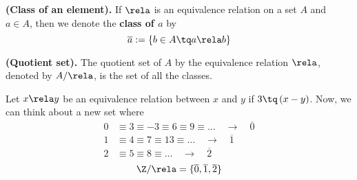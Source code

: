 \begin{definition}
    \textbf{(Class of an element).} If $\rela$ is an equivalence relation on a set $A$ and $a\in A$, then we denote the \textbf{class of $a$} by
    \begin{equation}
        \overline{a} := \{b\in A \tq a\rela b\} 
    \end{equation}
\end{definition}
\newpage
\begin{definition}
    \textbf{(Quotient set).} The quotient set of $A$ by the equivalence relation $\rela$, denoted by $A / \rela$, is the set of all the classes.
\end{definition}
\begin{example}
    Let $x\rela y$ be an equivalence relation between $x$ and $y$ if $3\tq \left( x - y \right)$. Now, we can think about a new set where
    \begin{align}
        0&\equiv 3\equiv -3\equiv 6\equiv 9\equiv\ldots\quad\rightarrow\quad\overline{0} \\
        1&\equiv 4\equiv 7\equiv 13\equiv\ldots\quad\rightarrow\quad\overline{1} \\
        2&\equiv 5\equiv 8\equiv\ldots\quad\rightarrow\quad\overline{2}
    \end{align}
    \begin{equation}
        \Z / \rela = \{\overline{0}, \overline{1}, \overline{2}\} 
    \end{equation}
\end{example}
